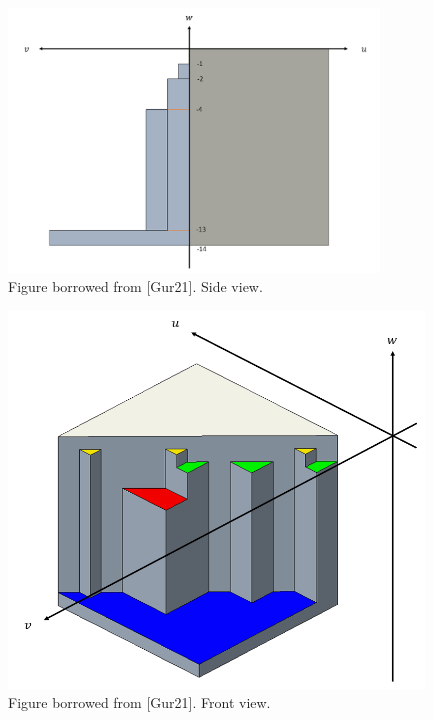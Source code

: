 \documentclass[english, LaM, oneside, noexaminfo]{sapthesis}
\begin{document}
\begin{figure}[tb]
\centering
\includegraphics[height=7cm]{Ziggurat 2.png}
\caption{Figure borrowed from [Gur21]. Side view.}\label{fig:Ziggurat 2}
\end{figure}

\begin{figure}[tb]
\centering
\includegraphics[height=10cm]{Ziggurat 3.png}
\caption{Figure borrowed from [Gur21]. Front view. }\label{fig:Ziggurat 3}
\end{figure}
\end{document}
